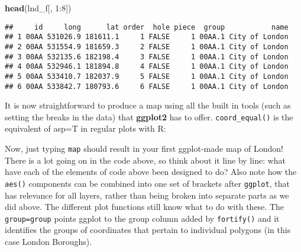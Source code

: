 \documentclass[]{article}
\newenvironment{Shaded}{}{}
\newcommand{\KeywordTok}[1]{\textcolor[rgb]{0.00,0.44,0.13}{\textbf{{#1}}}}
\newcommand{\DataTypeTok}[1]{\textcolor[rgb]{0.56,0.13,0.00}{{#1}}}
\newcommand{\DecValTok}[1]{\textcolor[rgb]{0.25,0.63,0.44}{{#1}}}
\newcommand{\CharTok}[1]{\textcolor[rgb]{0.25,0.44,0.63}{{#1}}}
\newcommand{\StringTok}[1]{\textcolor[rgb]{0.25,0.44,0.63}{{#1}}}
\newcommand{\NormalTok}[1]{{#1}}
\begin{document}
\begin{Shaded}
\begin{Highlighting}[]
\KeywordTok{head}\NormalTok{(lnd_f[, }\DecValTok{1}\NormalTok{:}\DecValTok{8}\NormalTok{])}
\end{Highlighting}
\end{Shaded}

\begin{verbatim}
##     id     long      lat order  hole piece  group           name
## 1 00AA 531026.9 181611.1     1 FALSE     1 00AA.1 City of London
## 2 00AA 531554.9 181659.3     2 FALSE     1 00AA.1 City of London
## 3 00AA 532135.6 182198.4     3 FALSE     1 00AA.1 City of London
## 4 00AA 532946.1 181894.8     4 FALSE     1 00AA.1 City of London
## 5 00AA 533410.7 182037.9     5 FALSE     1 00AA.1 City of London
## 6 00AA 533842.7 180793.6     6 FALSE     1 00AA.1 City of London
\end{verbatim}

It is now straightforward to produce a map using all the built in tools
(such as setting the breaks in the data) that \textbf{ggplot2} has to
offer. \texttt{coord\_equal()} is the equivalent of asp=T in regular
plots with R:

\begin{Shaded}
\end{Shaded}

Now, just typing \texttt{map} should result in your first ggplot-made
map of London! There is a lot going on in the code above, so think about
it line by line: what have each of the elements of code above been
designed to do? Also note how the \texttt{aes()} components can be
combined into one set of brackets after \texttt{ggplot}, that has
relevance for all layers, rather than being broken into separate parts
as we did above. The different plot functions still know what to do with
these. The \texttt{group=group} points ggplot to the group column added
by \texttt{fortify()} and it identifies the groups of coordinates that
pertain to individual polygons (in this case London Boroughs).
\end{document}
